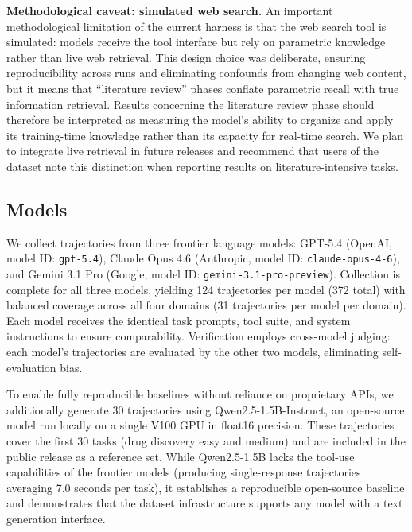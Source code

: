 \documentclass{article}
\begin{document}
\textbf{Methodological caveat: simulated web search.} An important methodological limitation of the current harness is that the web search tool is simulated: models receive the tool interface but rely on parametric knowledge rather than live web retrieval. This design choice was deliberate, ensuring reproducibility across runs and eliminating confounds from changing web content, but it means that ``literature review'' phases conflate parametric recall with true information retrieval. Results concerning the literature review phase should therefore be interpreted as measuring the model's ability to organize and apply its training-time knowledge rather than its capacity for real-time search. We plan to integrate live retrieval in future releases and recommend that users of the dataset note this distinction when reporting results on literature-intensive tasks.

\subsection{Models}
\label{sec:models}

We collect trajectories from three frontier language models: GPT-5.4 (OpenAI, model ID: \texttt{gpt-5.4}), Claude Opus 4.6 (Anthropic, model ID: \texttt{claude-opus-4-6}), and Gemini 3.1 Pro (Google, model ID: \texttt{gemini-3.1-pro-preview}). Collection is complete for all three models, yielding 124 trajectories per model (372 total) with balanced coverage across all four domains (31 trajectories per model per domain). Each model receives the identical task prompts, tool suite, and system instructions to ensure comparability. Verification employs cross-model judging: each model's trajectories are evaluated by the other two models, eliminating self-evaluation bias.

To enable fully reproducible baselines without reliance on proprietary APIs, we additionally generate 30 trajectories using Qwen2.5-1.5B-Instruct, an open-source model run locally on a single V100 GPU in float16 precision. These trajectories cover the first 30 tasks (drug discovery easy and medium) and are included in the public release as a reference set. While Qwen2.5-1.5B lacks the tool-use capabilities of the frontier models (producing single-response trajectories averaging 7.0 seconds per task), it establishes a reproducible open-source baseline and demonstrates that the dataset infrastructure supports any model with a text generation interface.

\end{document}
